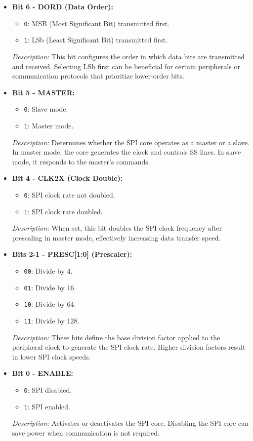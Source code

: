   \begin{itemize}
      \item \textbf{Bit 6 - DORD (Data Order):} 
      \begin{itemize}
          \item \texttt{0}: MSB (Most Significant Bit) transmitted first.
          \item \texttt{1}: LSb (Least Significant Bit) transmitted first.
      \end{itemize}
      \textit{Description:} This bit configures the order in which data bits are transmitted and received. Selecting LSb first can be beneficial for certain peripherals or communication protocols that prioritize lower-order bits.
      
      \item \textbf{Bit 5 - MASTER:} 
      \begin{itemize}
          \item \texttt{0}: Slave mode.
          \item \texttt{1}: Master mode.
      \end{itemize}
      \textit{Description:} Determines whether the SPI core operates as a master or a slave. In master mode, the core generates the clock and controls SS lines. In slave mode, it responds to the master's commands.
      
      \item \textbf{Bit 4 - CLK2X (Clock Double):} 
      \begin{itemize}
          \item \texttt{0}: SPI clock rate not doubled.
          \item \texttt{1}: SPI clock rate doubled.
      \end{itemize}
      \textit{Description:} When set, this bit doubles the SPI clock frequency after prescaling in master mode, effectively increasing data transfer speed.
      
      \item \textbf{Bits 2-1 - PRESC[1:0] (Prescaler):} 
      \begin{itemize}
          \item \texttt{00}: Divide by 4.
          \item \texttt{01}: Divide by 16.
          \item \texttt{10}: Divide by 64.
          \item \texttt{11}: Divide by 128.
      \end{itemize}
      \textit{Description:} These bits define the base division factor applied to the peripheral clock to generate the SPI clock rate. Higher division factors result in lower SPI clock speeds.
      
      \item \textbf{Bit 0 - ENABLE:} 
      \begin{itemize}
          \item \texttt{0}: SPI disabled.
          \item \texttt{1}: SPI enabled.
      \end{itemize}
      \textit{Description:} Activates or deactivates the SPI core. Disabling the SPI core can save power when communication is not required.
  \end{itemize}
  
